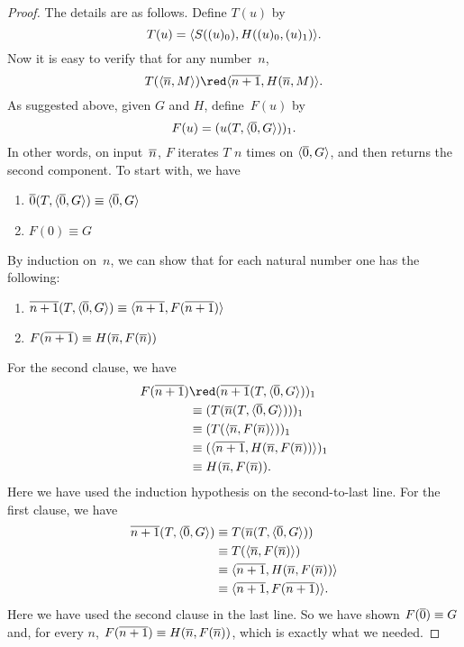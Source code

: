 \documentclass[../../include/open-logic-section]{subfiles}
\begin{document}
\begin{proof}
The details are as follows. Define $T(u)$ by
\[
T(u) = \langle S((u)_0), H((u)_0,(u)_1) \rangle.
\]
Now it is easy to verify that for any number~$n$, 
\[
T(\tuple{\num{n}, M}) \red \tuple{\num{n+1}, H(\num{n}, M)}.
\]
As suggested above, given $G$ and $H$, define~$F(u)$ by
\[
F(u) = (u(T,\langle \overline{0}, G \rangle))_1.
\]
In other words, on input~$\overline{n}$, $F$ iterates $T$ $n$ times on
$\langle \overline{0}, G \rangle$, and then returns the second component.  To start
with, we have
\begin{enumerate}
\item $\overline{0} (T, \langle \overline{0}, G \rangle) \equiv \langle \overline{0}, G \rangle$
\item $F(\num{0}) \equiv G$
\end{enumerate}
By induction on~$n$, we can show that for each natural number one has
the following:
\begin{enumerate}
\item $\overline{n+1}(T, \langle \overline{0}, G \rangle) \equiv \langle \overline{n+1}, F(\overline{n+1}) \rangle$
\item $F(\overline{n+1}) \equiv H(\overline{n}, F(\overline{n}))$
\end{enumerate}
For the second clause, we have
\begin{align*}
F(\num{n+1}) & \red (\num{n+1}(T, \tuple{\num 0, G}))_1 \\
& \equiv (T(\num{n} (T, \tuple{\num 0, G})))_1 \\
& \equiv (T(\tuple{\num{n}, F(\num{n})}))_1 \\
& \equiv (\tuple{\num{n+1}, H(\num{n}, F(\num{n}))})_1 \\
& \equiv H(\num{n}, F(\num{n})).
\end{align*}
Here we have used the induction hypothesis on the second-to-last
line. For the first clause, we have
\begin{align*}
\num{n+1} (T, \tuple{\num 0, G}) & 
\equiv T(\num{n} (T, \tuple{\num 0, G})) \\
& \equiv T( \tuple{\num{n}, F(\num{n})}) \\
& \equiv \tuple{\num{n+1}, H(\num{n}, F(\num{n}))} \\
& \equiv \tuple{\num{n+1}, F(\num{n+1})}.
\end{align*}
Here we have used the second clause in the last line. So we have shown
$F(\overline{0}) \equiv G$ and, for every $n$, $F(\overline{n+1}) \equiv H(\overline{n}, F(\overline{n}))$, which is exactly what we needed.
\end{proof}
\end{document}
